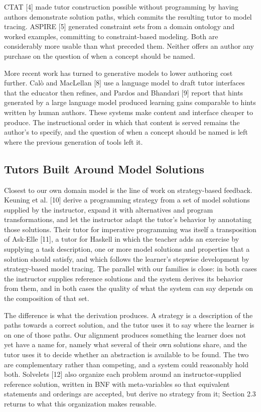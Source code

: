\documentclass[10pt,twocolumn,letterpaper]{article}
\begin{document}
CTAT [4] made tutor construction possible without programming by
having authors demonstrate solution paths, which commits the resulting
tutor to model tracing. ASPIRE [5] generated constraint sets from a
domain ontology and worked examples, committing to constraint-based
modeling. Both are considerably more usable than what preceded them.
Neither offers an author any purchase on the question of when a concept
should be named.

More recent work has turned to generative models to lower authoring cost further. Calò and MacLellan [8] use a language model to draft tutor interfaces that the educator then refines, and Pardos and Bhandari [9] report that hints generated by a large language model produced learning gains comparable to hints written by human authors. These systems make content and interface cheaper to produce. The instructional order in which that content is served remains the author's to specify, and the question of when a concept should be named is left where the previous generation of tools left it.

\subsection{Tutors Built Around Model Solutions}
Closest to our own domain model is the line of work on strategy-based
feedback. Keuning et al. [10] derive a programming strategy from a set of
model solutions supplied by the instructor, expand it with alternatives and
program transformations, and let the instructor adapt the tutor's behavior by
annotating those solutions. Their tutor for imperative programming was itself a transposition of Ask-Elle [11], a tutor for Haskell in which the teacher adds an exercise by supplying a task description, one or more model solutions and properties that a solution should satisfy, and which follows the learner's stepwise development by strategy-based model tracing. The parallel with
our families is close: in both cases the instructor supplies reference solutions
and the system derives its behavior from them, and in both cases the quality of
what the system can say depends on the composition of that set. 

The difference is what the derivation produces. A strategy is a description of
the paths towards a correct solution, and the tutor uses it to say where the
learner is on one of those paths. Our alignment produces something the learner
does not yet have a name for, namely what several of their own solutions share,
and the tutor uses it to decide whether an abstraction is available to be found.
The two are complementary rather than competing, and a system could reasonably
hold both. 
Solvelets [12] also organize each problem around an instructor-supplied reference solution, written in BNF with meta-variables so that equivalent statements and orderings are accepted, but derive no strategy from it; Section 2.3 returns to what this organization makes reusable.
\end{document}
